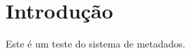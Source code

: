 \documentclass[mestrado]{UnB-PPGT}
\begin{document}
\chapter{Introdução}
Este é um teste do sistema de metadados.
\end{document}

